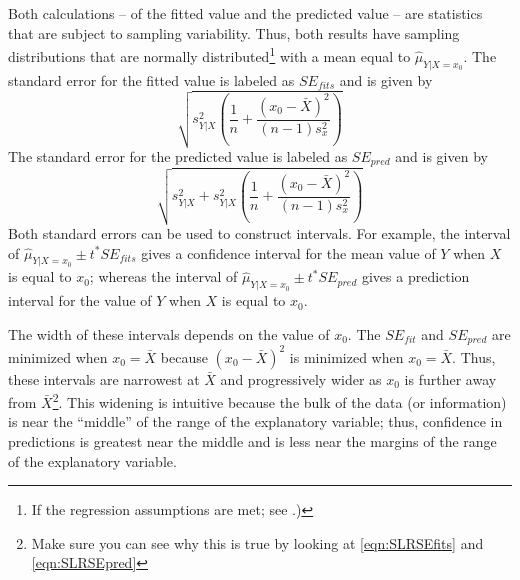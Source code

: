 \documentclass[10pt,openany]{book}\usepackage[]{graphicx}\usepackage[]{color}
\begin{document}

\vspace{-12pt}

Both calculations -- of the fitted value and the predicted value -- are statistics that are subject to sampling variability.  Thus, both results have sampling distributions that are normally distributed\footnote{If the regression assumptions are met; see .)} with a mean equal to $\hat{\mu}_{Y|X=x_{0}}$.  The standard error for the fitted value is labeled as $SE_{fits}$ and is given by
\begin{equation}\label{eqn:SLRSEfits}
    \sqrt{s_{Y|X}^{2}\left(\frac{1}{n}+\frac{\left(x_{0}-\bar{X}\right)^{2}}{(n-1)s_{x}^{2}}\right)}
\end{equation}
The standard error for the predicted value is labeled as $SE_{pred}$ and is given by
\begin{equation}\label{eqn:SLRSEpred}
    \sqrt{s_{Y|X}^{2}+s_{Y|X}^{2}\left(\frac{1}{n}+\frac{\left(x_{0}-\bar{X}\right)^{2}}{(n-1)s_{x}^{2}}\right)}
\end{equation}
Both standard errors can be used to construct intervals.  For example, the interval of $\hat{\mu}_{Y|X=x_{0}}\pm t^{*}SE_{fits}$ gives a confidence interval for the mean value of $Y$ when $X$ is equal to $x_{0}$; whereas the interval of $\hat{\mu}_{Y|X=x_{0}}\pm t^{*}SE_{pred}$ gives a prediction interval for the value of $Y$ when $X$ is equal to $x_{0}$.


The width of these intervals depends on the value of $x_{0}$.  The $SE_{fit}$ and $SE_{pred}$ are minimized when $x_{0}=\bar{X}$ because $\left(x_{0}-\bar{X}\right)^{2}$ is minimized when $x_{0}=\bar{X}$.  Thus, these intervals are narrowest at $\bar{X}$ and progressively wider as $x_{0}$ is further away from $\bar{X}$\footnote{Make sure you can see why this is true by looking at \eqref{eqn:SLRSEfits} and \eqref{eqn:SLRSEpred}}.  This widening is intuitive because the bulk of the data (or information) is near the ``middle'' of the range of the explanatory variable; thus, confidence in predictions is greatest near the middle and is less near the margins of the range of the explanatory variable.
\end{document}
